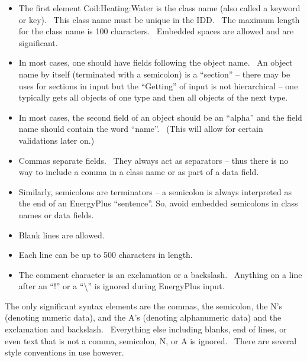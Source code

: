 \begin{itemize}
\item
  The first element Coil:Heating:Water is the class name (also called a keyword or key).~ This class name must be unique in the IDD.~ The maximum length for the class name is 100 characters.~ Embedded spaces are allowed and are significant.
\item
  In most cases, one should have fields following the object name.~ An object name by itself (terminated with a semicolon) is a ``section'' -- there may be uses for sections in input but the ``Getting'' of input is not hierarchical -- one typically gets all objects of one type and then all objects of the next type.
\item
  In most cases, the second field of an object should be an ``alpha'' and the field name should contain the word ``name''.~ (This will allow for certain validations later on.)
\item
  Commas separate fields.~ They always act as separators -- thus there is no way to include a comma in a class name or as part of a data field.
\item
  Similarly, semicolons are terminators -- a semicolon is always interpreted as the end of an EnergyPlus ``sentence''. So, avoid embedded semicolons in class names or data fields.
\item
  Blank lines are allowed.
\item
  Each line can be up to 500 characters in length.
\item
  The comment character is an exclamation or a backslash.~ Anything on a line after an ``!'' or a ``\textbackslash{}'' is ignored during EnergyPlus input.
\end{itemize}

The only significant syntax elements are the commas, the semicolon, the N's (denoting numeric data), and the A's (denoting alphanumeric data) and the exclamation and backslash.~ Everything else including blanks, end of lines, or even text that is not a comma, semicolon, N, or A is ignored.~ There are several style conventions in use however.

